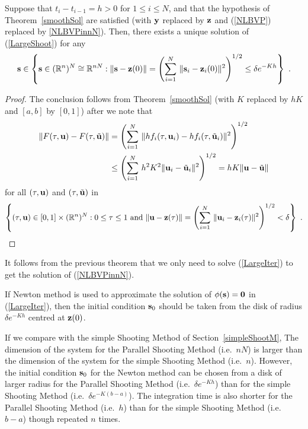 \begin{theorem}
Suppose that $t_i - t_{i-1} = h > 0$ for $1\leq i \leq N$,
and that the hypothesis of Theorem~\ref{smoothSol} are satisfied
(with $\mathbf{y}$ replaced by $\mathbf{z}$ and (\ref{NLBVP}) replaced by 
\ref{NLBVPinnN}).  Then, there exists a unique solution of
(\ref{LargeShoot}) for any
\[
\mathbf{s} \in \left\{ \mathbf{s} \in (\mathbb{R}^n)^N \cong \mathbb{R}^{nN} :
\| \mathbf{s} - \mathbf{z}(0) \| = \left( \sum_{i=1}^N
\,\| \mathbf{s}_i - \mathbf{z}_i(0)  \|^2 \right)^{1/2} \leq
\delta e^{-K h} \right\} \ .
\]
\end{theorem}

\begin{proof}
The conclusion follows from Theorem~\ref{smoothSol} (with $K$ replaced
by $hK$ and $[a,b]$ by $[0,1]$) after we note that
\begin{align*}
\| F(\tau,\mathbf{u}) - F(\tau,\tilde{\mathbf{u}}) \|
& = \left( \sum_{i=1}^N\, \| h f_i(\tau,\mathbf{u}_i) -
h f_i(\tau,\tilde{\mathbf{u}}_i) \|^2 \right)^{1/2} \\
&\leq \left( \sum_{i=1}^N\, h^2 K^2
\| \mathbf{u}_i - \tilde{\mathbf{u}}_i \|^2 \right)^{1/2}
= h K \| \mathbf{u} - \tilde{\mathbf{u}} \|
\end{align*}
for all $(\tau,\mathbf{u})$ and $(\tau,\tilde{\mathbf{u}})$ in
\[
\left\{ (\tau,\mathbf{u}) \in [0,1]\times (\mathbb{R}^n)^N :
0 \leq \tau \leq 1 \text{ and }
\| \mathbf{u} - \mathbf{z}(\tau) \| = \left(
\sum_{i=1}^N \,\| \mathbf{u}_i - \mathbf{z}_i(\tau) \|^2 \right)^{1/2} <
\delta \right\} \ .  \qedhere
\]
\end{proof}

It follows from the previous theorem that we only need to solve
(\ref{LargeIter}) to get the solution of (\ref{NLBVPinnN}).

If Newton method is used to approximate the solution
of $\phi(\mathbf{s}) = \mathbf{0}$ in (\ref{LargeIter}), then 
the initial condition $\mathbf{s}_0$ should be taken from
the disk of radius $\delta e^{-Kh}$ centred at $\mathbf{z}(0)$.

If we compare with the simple Shooting Method of
Section~\ref{simpleShootM},  The dimension of the system for the 
Parallel Shooting Method (i.e.\ $nN$) is larger than the dimension of
the system for the simple Shooting Method (i.e.\ $n$).  However,
the initial condition $\mathbf{s}_0$ for the Newton method can be chosen
from a disk of larger radius for the Parallel Shooting Method
(i.e.\ $\delta e^{-Kh}$) than for the simple Shooting Method
(i.e.\ $\delta e^{-K(b-a)}$).  The integration time is also shorter
for the Parallel Shooting Method (i.e.\ $h$) than for the simple
Shooting Method (i.e.\ $b-a$) though repeated $n$ times.

